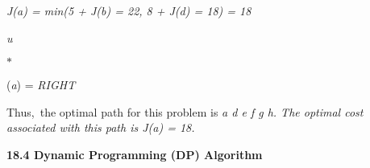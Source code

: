\documentclass[12pt,twoside]{article}
\begin{document}
\vspace{\baselineskip}
\begin{adjustwidth}{2.45in}{0.0in}
{\fontsize{10pt}{12.0pt}\selectfont \textit{J(a) = min(5 + J(b) = 22, 8 + J(d) = 18) = 18}\par}\par

\end{adjustwidth}

\begin{adjustwidth}{2.36in}{0.0in}
\begin{FlushLeft}
{\fontsize{10pt}{12.0pt}\selectfont \textit{u}{\fontsize{7pt}{8.4pt}\selectfont $\ast$  {\fontsize{10pt}{12.0pt}\selectfont (\textit{a}) = \textit{RIGHT}\par}\par}\par}
\end{FlushLeft}\par

\end{adjustwidth}


\vspace{\baselineskip}

\vspace{\baselineskip}
\begin{adjustwidth}{0.58in}{0.14in}
{\fontsize{10pt}{12.0pt}\selectfont Thus,\  the optimal path for this problem  is \textit{a \tabto{3.58in} d \tabto{3.9in} e \tabto{4.23in} f \tabto{4.54in} g \tabto{4.86in} h. The optimal cost associated with this path is J(a) = 18.}\par}\par

\end{adjustwidth}


\vspace{\baselineskip}

\vspace{\baselineskip}
\begin{adjustwidth}{0.58in}{0.0in}
{\fontsize{14pt}{16.8pt}\selectfont \textbf{18.4 \tabto{1.13in} Dynamic Programming (DP) Algorithm}\par}\par

\end{adjustwidth}


\vspace{\baselineskip}
\end{document}
